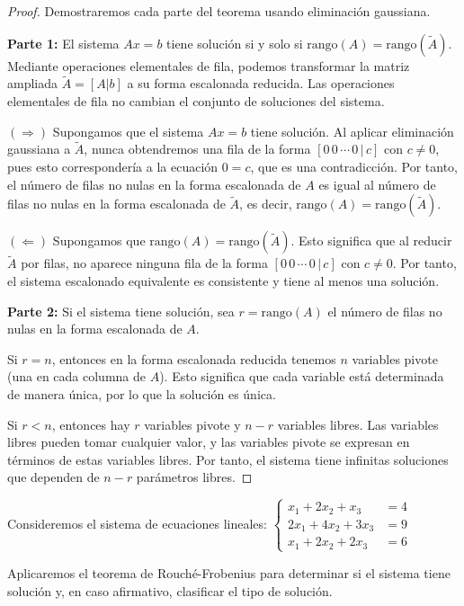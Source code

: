 \begin{proof}
Demostraremos cada parte del teorema usando eliminación gaussiana.

\textbf{Parte 1:} El sistema $Ax = b$ tiene solución si y solo si $\text{rango}(A) = \text{rango}(\tilde{A})$. Mediante operaciones elementales de fila, podemos transformar la matriz ampliada $\tilde{A} = [A|b]$ a su forma escalonada reducida. Las operaciones elementales de fila no cambian el conjunto de soluciones del sistema.

$(\Rightarrow)$ Supongamos que el sistema $Ax = b$ tiene solución. Al aplicar eliminación gaussiana a $\tilde{A}$, nunca obtendremos una fila de la forma $[0 \, 0 \, \cdots \, 0 \, | \, c]$ con $c \neq 0$, pues esto correspondería a la ecuación $0 = c$, que es una contradicción. Por tanto, el número de filas no nulas en la forma escalonada de $A$ es igual al número de filas no nulas en la forma escalonada de $\tilde{A}$, es decir, $\text{rango}(A) = \text{rango}(\tilde{A})$.

$(\Leftarrow)$ Supongamos que $\text{rango}(A) = \text{rango}(\tilde{A})$. Esto significa que al reducir $\tilde{A}$ por filas, no aparece ninguna fila de la forma $[0 \, 0 \, \cdots \, 0 \, | \, c]$ con $c \neq 0$. Por tanto, el sistema escalonado equivalente es consistente y tiene al menos una solución.

\textbf{Parte 2:} Si el sistema tiene solución, sea $r = \text{rango}(A)$ el número de filas no nulas en la forma escalonada de $A$.

Si $r = n$, entonces en la forma escalonada reducida tenemos $n$ variables pivote (una en cada columna de $A$). Esto significa que cada variable está determinada de manera única, por lo que la solución es única.

Si $r < n$, entonces hay $r$ variables pivote y $n - r$ variables libres. Las variables libres pueden tomar cualquier valor, y las variables pivote se expresan en términos de estas variables libres. Por tanto, el sistema tiene infinitas soluciones que dependen de $n - r$ parámetros libres.
\end{proof}

\begin{example}
Consideremos el sistema de ecuaciones lineales:
$\begin{cases}
x_1 + 2x_2 + x_3 &= 4\\
2x_1 + 4x_2 + 3x_3 &= 9\\
x_1 + 2x_2 + 2x_3 &= 6
\end{cases}$

Aplicaremos el teorema de Rouché-Frobenius para determinar si el sistema tiene solución y, en caso afirmativo, clasificar el tipo de solución.
\end{example}

